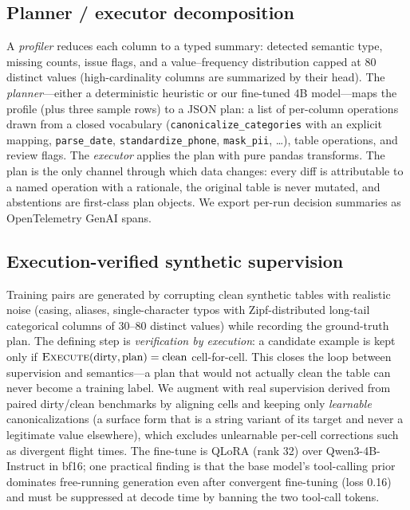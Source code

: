 \documentclass[11pt]{article}
\begin{document}
\subsection{Planner / executor decomposition}
A \emph{profiler} reduces each column to a typed summary: detected semantic type, missing
counts, issue flags, and a value--frequency distribution capped at 80 distinct values
(high-cardinality columns are summarized by their head). The \emph{planner}---either a
deterministic heuristic or our fine-tuned 4B model---maps the profile (plus three sample
rows) to a JSON plan: a list of per-column operations drawn from a closed vocabulary
(\texttt{canonicalize\_categories} with an explicit mapping, \texttt{parse\_date},
\texttt{standardize\_phone}, \texttt{mask\_pii}, \ldots), table operations, and review
flags. The \emph{executor} applies the plan with pure pandas transforms. The plan is the
only channel through which data changes: every diff is attributable to a named operation
with a rationale, the original table is never mutated, and abstentions are first-class
plan objects. We export per-run decision summaries as OpenTelemetry GenAI spans.

\subsection{Execution-verified synthetic supervision}
\label{sec:sft}
Training pairs are generated by corrupting clean synthetic tables with realistic noise
(casing, aliases, single-character typos with Zipf-distributed long-tail categorical
columns of 30--80 distinct values) while recording the ground-truth plan. The defining
step is \emph{verification by execution}: a candidate example is kept only if
$\textsc{Execute}(\text{dirty}, \text{plan}) = \text{clean}$ cell-for-cell. This closes
the loop between supervision and semantics---a plan that would not actually clean the
table can never become a training label. We augment with real supervision derived from
paired dirty/clean benchmarks by aligning cells and keeping only \emph{learnable}
canonicalizations (a surface form that is a string variant of its target and never a
legitimate value elsewhere), which excludes unlearnable per-cell corrections such as
divergent flight times. The fine-tune is QLoRA (rank 32) over Qwen3-4B-Instruct in
bf16; one practical finding is that the base model's tool-calling prior dominates
free-running generation even after convergent fine-tuning (loss 0.16) and must be
suppressed at decode time by banning the two tool-call tokens.
\end{document}
